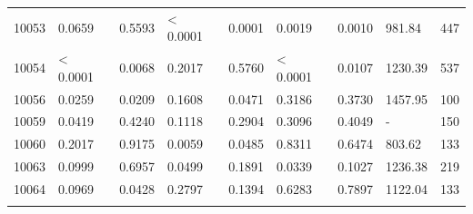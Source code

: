 \begin{table}[H]
{\begin{tabular}{lllllllll}
10053 & 0.0659 & 0.5593 & {\color{red} < 0.0001} & {\color{red}0.0001} & {\color{red}0.0019} & {\color{red}0.0010} & 981.84 & 447 \\ 
10054 & {\color{red} < 0.0001} & {\color{red}0.0068} & 0.2017 & 0.5760 & {\color{red} < 0.0001} & {\color{red}0.0107} & 1230.39 & 537 \\ 
10056 & {\color{red}0.0259} & {\color{red}0.0209} & 0.1608 & {\color{red}0.0471} & 0.3186 & 0.3730 & 1457.95 & 100 \\ 
10059 & {\color{red}0.0419} & 0.4240 & 0.1118 & 0.2904 & 0.3096 & 0.4049 & - & 150 \\ 
10060 & 0.2017 & 0.9175 & {\color{red}0.0059} & {\color{red}0.0485} & 0.8311 & 0.6474 & 803.62 & 133 \\ 
10063 & 0.0999 & 0.6957 & {\color{red}0.0499} & 0.1891 & {\color{red}0.0339} & 0.1027 & 1236.38 & 219 \\ 
10064 & 0.0969 & {\color{red}0.0428} & 0.2797 & 0.1394 & 0.6283 & 0.7897 & 1122.04 & 133 \\ \hline
\label{tab:nosocsI}
\end{tabular}
}
\end{table}

